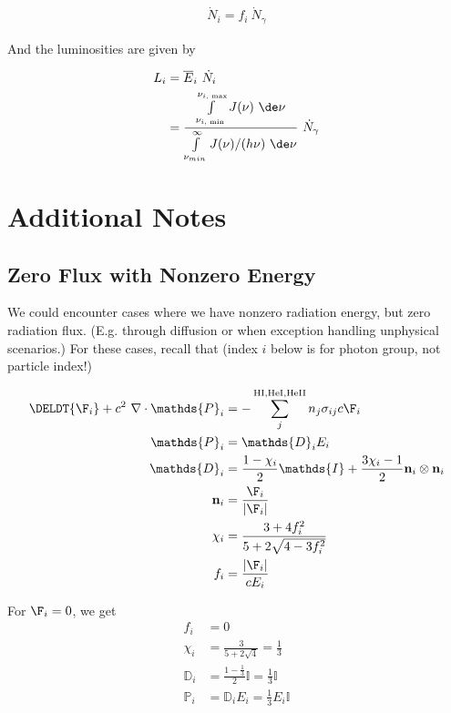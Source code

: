 \begin{align}
\dot{N}_i = f_i\ \dot{N}_\gamma
\end{align}

And the luminosities are given by

\begin{align}
	L_i &= \overline{E}_i \ \dot{N}_i \\
			&= \frac{\int\limits_{\nu_{i \text{, min}}}^{\nu_{i \text{, max}}} J(\nu) \ \de \nu }{\int\limits_{\nu_{min}}^{\infty} J(\nu) / (h \nu) \ \de \nu} \ \dot{N}_\gamma
\end{align}




\section{Additional Notes}

\subsection{Zero Flux with Nonzero Energy}

We could encounter cases where we have nonzero radiation energy, but zero
radiation flux. (E.g. through diffusion or when exception handling unphysical
scenarios.) For these cases, recall that (index $i$ below is for photon group,
not particle index!)

\begin{align}
	\DELDT{\F_i} + c^2 \ \nabla \cdot \mathds{P}_i &=
		- \sum\limits_{j}^{\mathrm{HI, HeI, HeII}} n_j \sigma_{i j} c \F_i \\
	\mathds{P}_i &=
		\mathds{D}_i E_i \\
	\mathds{D}_i &=
		\frac{1- \chi_i}{2} \mathds{I} + \frac{3 \chi_i - 1}{2} \mathbf{n}_i \otimes \mathbf{n}_i\\
	\mathbf{n}_i &=
		\frac{\F_i}{|\F_i|} \\
	\chi_i &=
		\frac{3 + 4 f_i ^2}{5 + 2 \sqrt{4 - 3 f_i^2}} \\
	f_i &=
		\frac{|\F_i|}{c E_i}
\end{align}

For $\F_i = 0$, we get
\begin{align}
	f_i &= 0 \\
	\chi_i &= \frac{3}{5 + 2 \sqrt{4}} = \frac{1}{3} \\
	\mathds{D}_i &= \frac{1- \frac{1}{3}}{2} \mathds{I} = \frac{1}{3} \mathds{I} \\
	\mathds{P}_i &= \mathds{D}_i E_i =  \frac{1}{3} E_i \mathds{I}
\end{align}

